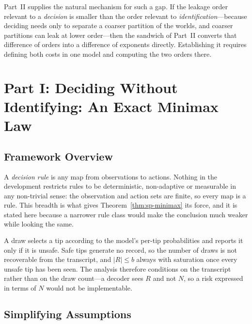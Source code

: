 Part~II supplies the natural mechanism for such a gap. If the leakage order relevant to a
\emph{decision} is smaller than the order relevant to \emph{identification}---because
deciding needs only to separate a coarser partition of the worlds, and coarser partitions can
leak at lower order---then the sandwich of Part~II converts that difference of orders into a
difference of exponents directly. Establishing it requires defining both costs in one model
and computing the two orders there.


\section{Part I: Deciding Without Identifying: An Exact Minimax Law}

\label{sec:sp-setting}

\subsection{Framework Overview}

A \emph{decision rule} is any map from observations to actions. Nothing in the development
restricts rules to be deterministic, non-adaptive or measurable in any non-trivial sense: the
observation and action sets are finite, so every map is a rule. This breadth is what gives
Theorem~\ref{thm:sp-minimax} its force, and it is stated here because a narrower rule class would
make the conclusion much weaker while looking the same.

A draw selects a tip according to the model's per-tip probabilities and reports it only if it
is unsafe. Safe tips generate no record, so the number of draws is not recoverable from the
transcript, and $|R|\le b$ always with saturation once every unsafe tip has been seen. The
analysis therefore conditions on the transcript rather than on the draw count---a decoder sees
$R$ and not $N$, so a risk expressed in terms of $N$ would not be implementable.

\subsection{Simplifying Assumptions}

